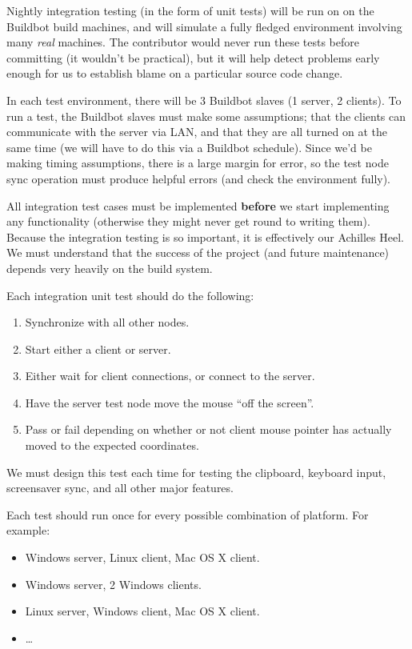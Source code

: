 Nightly integration testing (in the form of unit tests) will be run on on the 
Buildbot build machines, and will
simulate a fully fledged environment involving many \textit{real} machines. The 
contributor would never run these tests before committing (it wouldn't be 
practical), but it will help detect problems early enough for us to establish
blame on a particular source code change.

In each test environment, there will be 3 Buildbot slaves (1 server, 2 clients).
To run a test, the Buildbot slaves must make some assumptions; that the clients
can communicate with the server via LAN, and that they are all turned on at the 
same time (we will have to do this via a Buildbot schedule). Since we'd be 
making timing assumptions, there is a large margin for error, so the test node
sync operation must produce helpful errors (and check the environment fully).

All integration test cases must be implemented \textbf{before} we start 
implementing any functionality (otherwise they might never get round to writing
them). Because the integration testing is so important, it is effectively our 
Achilles Heel. We must understand that the success of the project (and future 
maintenance) depends very heavily on the build system.

Each integration unit test should do the following:

\begin{enumerate}
  \item Synchronize with all other nodes.
  \item Start either a client or server.
  \item Either wait for client connections, or connect to the server.
  \item Have the server test node move the mouse ``off the screen''.
  \item Pass or fail depending on whether or not client mouse pointer has
    actually moved to the expected coordinates.
\end{enumerate}

We must design this test each time for testing the clipboard, keyboard input,
screensaver sync, and all other major features.

Each test should run once for every possible combination of platform. For 
example:

\begin{itemize}
  \item Windows server, Linux client, Mac OS X client.
  \item Windows server, 2 Windows clients.
  \item Linux server, Windows client, Mac OS X client.
  \item \ldots
\end{itemize}

